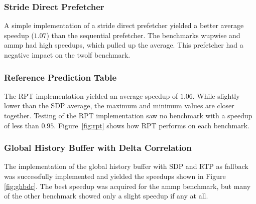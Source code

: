 \subsubsection{Stride Direct Prefetcher}
A simple implementation of a stride direct prefetcher yielded a better average speedup ($1.07$) than the sequential prefetcher.
The benchmarks wupwise and ammp had high speedups, which pulled up the average.
This prefetcher had a negative impact on the twolf benchmark.


\subsubsection{Reference Prediction Table}
The RPT implementation yielded an average speedup of $1.06$.
While slightly lower than the SDP average, the maximum and minimum values are closer together.
Testing of the RPT implementation saw no benchmark with a speedup of less than $0.95$.
Figure~\ref{fig:rpt} shows how RPT performs on each benchmark.

\begin{figure*}
  
  \caption{Performance of RPT prefetcher across benchmarks.}
  \label{fig:rpt}
\end{figure*}

\subsubsection{Global History Buffer with Delta Correlation}
The implementation of the global history buffer with SDP and RTP as fallback was successfully implemented and yielded the speedups shown in Figure \ref{fig:ghbdc}.
The best speedup was acquired for the ammp benchmark, but many of the other benchmark showed only a slight speedup if any at all.


\begin{figure*}
  
  \caption{Speedup of each benchmark as a function of degree for the global history buffer with delta correlation and fall back to SDP and RTP.}
  \label{fig:ghbdc}
\end{figure*}

\begin{figure*}
  
  \caption{Average speedup as a function of prefetching degree for our final prefetcher implementation.}
  \label{fig:ghbdcavg}
\end{figure*}

